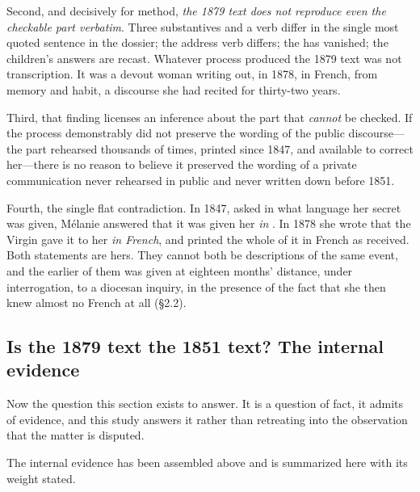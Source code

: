 Second, and decisively for method, \emph{the 1879 text does not
reproduce even the checkable part verbatim}. Three substantives and
a verb differ in the single most quoted sentence in the dossier;
the address verb differs; the  has vanished; the
children's answers are recast. Whatever process produced the 1879
text was not transcription. It was a devout woman writing out, in
1878, in French, from memory and habit, a discourse she had recited
for thirty-two years.

Third, that finding licenses an inference about the part that
\emph{cannot} be checked. If the process demonstrably did not
preserve the wording of the public discourse---the part rehearsed
thousands of times, printed since 1847, and available to correct
her---there is no reason to believe it preserved the wording of a
private communication never rehearsed in public and never written
down before 1851.

Fourth, the single flat contradiction. In 1847, asked in what
language her secret was given, Mélanie answered that it was given
her \emph{in }. In 1878 she wrote that the Virgin gave
it to her \emph{in French}, and printed the whole of it in French as
received. Both statements are hers. They cannot both be descriptions
of the same event, and the earlier of them was given at eighteen
months' distance, under interrogation, to a diocesan inquiry, in the
presence of the fact that she then knew almost no French at all
(\S2.2).

\subsection{Is the 1879 text the 1851 text? The internal evidence}

Now the question this section exists to answer. It is a question of
fact, it admits of evidence, and this study answers it rather than
retreating into the observation that the matter is disputed.

The internal evidence has been assembled above and is summarized
here with its weight stated.


